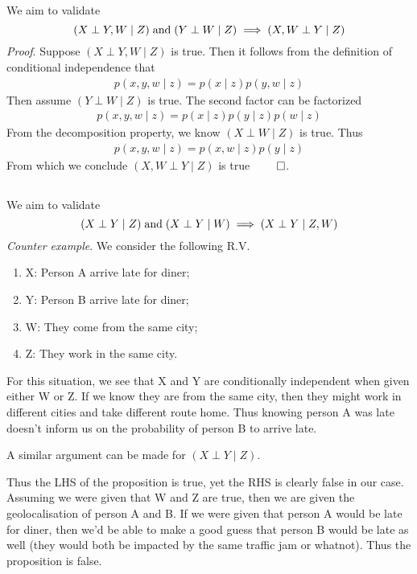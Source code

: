 \documentclass{article}
\newcommand{\s}{\hspace{0.1cm}}
\numberwithin{equation}{section}
\begin{document}
\subsection{}
We aim to validate
\begin{equation}
        (X \perp Y,W \mid Z) \s \text{and} \s (Y \perp W \mid Z) \implies  (X,W \perp Y \mid Z)
\end{equation}
\textit{Proof}. Suppose $(X \perp Y,W \mid Z)$ is true. 
Then it follows from the definition of conditional independence that
\begin{align*}
        p(x,y,w \mid z) = p(x \mid z) p(y,w \mid z) 
\end{align*}
Then assume $(Y \perp W \mid Z)$ is true. The second factor can be factorized
\begin{align*}
        p(x,y,w \mid z) = p(x \mid z) p(y \mid z) p(w \mid z)
\end{align*}
From the decomposition property, we know $(X \perp W \mid Z)$ is true. Thus
\begin{align*}
        p(x,y,w \mid z)  = p(x,w \mid z) p(y \mid z)
\end{align*}
From which we conclude $(X,W \perp Y \mid Z)$ is true $\qed$.

\subsection{}
We aim to validate
\begin{equation}
        (X \perp Y \mid Z) \s \text{and} \s (X \perp Y \mid W) \implies (X \perp Y \mid Z,W)
\end{equation}
\textit{Counter example}. We consider the following R.V.
\begin{enumerate}
        \item X: Person A arrive late for diner;
        \item Y: Person B arrive late for diner;
        \item W: They come from the same city;
        \item Z: They work in the same city.
\end{enumerate}
For this situation, we see that X and Y are conditionally independent when 
given either W or Z. If we know they are from the same city, then they might work 
in different cities and take different route home. Thus knowing person A was late doesn't inform 
us on the probability of person B to arrive late. \par
A similar argument can be made for  $(X \perp Y \mid Z)$. \par
Thus the LHS of the proposition is true, yet the RHS is clearly false in our case. 
Assuming we were given that W and Z are true, then we are given the geolocalisation 
of person A and B.
If we were given that 
person A would be late for diner, then we'd be able to make a good guess that person B would 
be late as well (they would both be impacted by the same traffic jam or whatnot).
Thus the proposition is false.
\end{document}
